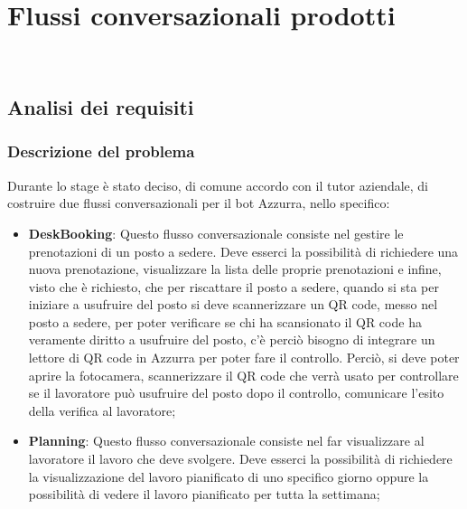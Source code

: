 
\chapter{Flussi conversazionali prodotti}
\label{cap:flussi di conversazione}

\\

\section{Analisi dei requisiti}
\subsection{Descrizione del problema}
	Durante lo stage è stato deciso, di comune accordo con il tutor aziendale, di costruire due flussi conversazionali per il bot Azzurra, nello specifico:
	\begin{itemize}
		\item \textbf{DeskBooking}: Questo flusso conversazionale consiste nel gestire le prenotazioni di un posto a sedere. Deve esserci la possibilità di richiedere una nuova prenotazione, visualizzare la lista delle proprie prenotazioni e infine, visto che è richiesto, che per riscattare il posto a sedere, quando si sta per iniziare a usufruire del posto si deve scannerizzare un QR code, messo nel posto a sedere, per poter verificare se chi ha scansionato il QR code ha veramente diritto a usufruire del posto, c'è perciò bisogno di integrare un lettore di QR code in Azzurra per poter fare il controllo. Perciò, si deve poter aprire la fotocamera, scannerizzare il QR code che verrà usato per controllare se il lavoratore può usufruire del posto dopo il controllo, comunicare l'esito della verifica al lavoratore;
		\item \textbf{Planning}: Questo flusso conversazionale consiste nel far visualizzare al lavoratore il lavoro che deve svolgere. Deve esserci la possibilità di richiedere la visualizzazione del lavoro pianificato di uno specifico giorno oppure la possibilità di vedere il lavoro pianificato per tutta la settimana;
	\end{itemize}
